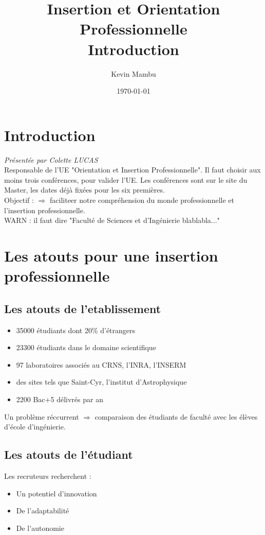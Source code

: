 \documentclass[10pt]{article}
\author{Kevin Mambu}
\date{\today}
\title{Insertion et Orientation Professionnelle\\Introduction}
\begin{document}
\maketitle

\tableofcontents

\newpage

\section{Introduction}
{\it Présentée par Colette LUCAS}\\
Responsable de l'UE "Orientation et Insertion Professionnelle". Il faut choisir
aux moins trois conférences, pour valider l'UE. Les conférences sont sur le site
du Master, les dates déjà fixées pour les six premières.\\
Objectif : $\Rightarrow$ faciliteer notre compréhension du monde professionnelle
et l'insertion professionnelle.\\
WARN : il faut dire "Faculté de Sciences et d'Ingénierie blablabla..."\\
\section{Les atouts pour une insertion professionnelle}
\subsection{Les atouts de l'etablissement}
\begin{itemize}
  \item 35000 étudiants dont 20\% d'étrangers
  \item 23300 étudiants dans le domaine scientifique
  \item 97 laboratoires associés au CRNS, l'INRA, l'INSERM
  \item des sites tels que Saint-Cyr, l'institut d'Astrophysique
  \item 2200 Bac+5 délivrés par an
\end{itemize}

Un problème réccurrent $\Rightarrow$ comparaison des étudiants de faculté avec
les élèves d'école d'ingénierie.

\subsection{Les atouts de l'étudiant}
Les recruteurs recherchent :
\begin{itemize}
  \item Un potentiel d'innovation
  \item De l'adaptabilité
  \item De l'autonomie
\end{itemize}
\end{document}
